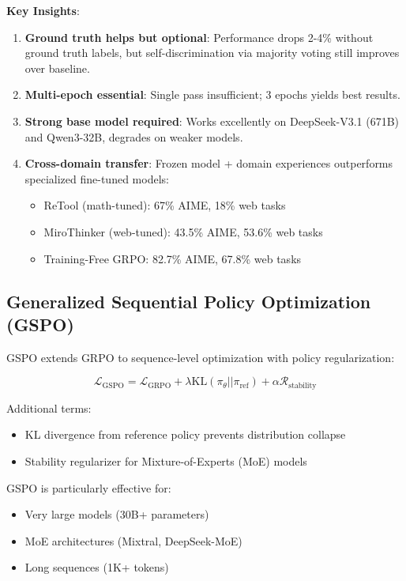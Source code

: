 \textbf{Key Insights}:
\begin{enumerate}
\item \textbf{Ground truth helps but optional}: Performance drops 2-4\% without ground truth labels, but self-discrimination via majority voting still improves over baseline.
\item \textbf{Multi-epoch essential}: Single pass insufficient; 3 epochs yields best results.
\item \textbf{Strong base model required}: Works excellently on DeepSeek-V3.1 (671B) and Qwen3-32B, degrades on weaker models.
\item \textbf{Cross-domain transfer}: Frozen model + domain experiences outperforms specialized fine-tuned models:
   \begin{itemize}
   \item ReTool (math-tuned): 67\% AIME, 18\% web tasks
   \item MiroThinker (web-tuned): 43.5\% AIME, 53.6\% web tasks
   \item Training-Free GRPO: 82.7\% AIME, 67.8\% web tasks
   \end{itemize}
\end{enumerate}

\subsection{Generalized Sequential Policy Optimization (GSPO)}

GSPO extends GRPO to sequence-level optimization with policy regularization:

\begin{equation}
\mathcal{L}_{\text{GSPO}} = \mathcal{L}_{\text{GRPO}} + \lambda \text{KL}(\pi_\theta || \pi_{\text{ref}}) + \alpha \mathcal{R}_{\text{stability}}
\end{equation}

Additional terms:
\begin{itemize}
\item KL divergence from reference policy prevents distribution collapse
\item Stability regularizer for Mixture-of-Experts (MoE) models
\end{itemize}

GSPO is particularly effective for:
\begin{itemize}
\item Very large models (30B+ parameters)
\item MoE architectures (Mixtral, DeepSeek-MoE)
\item Long sequences (1K+ tokens)
\end{itemize}


